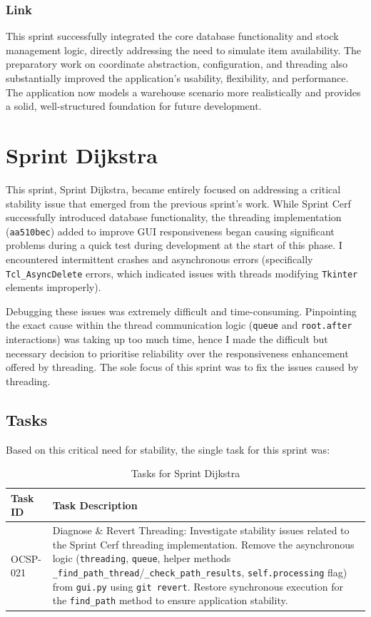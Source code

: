 \subsubsection{Link}
This sprint successfully integrated the core database functionality and stock management logic, directly addressing the need to simulate item availability. The preparatory work on coordinate abstraction, configuration, and threading also substantially improved the application's usability, flexibility, and performance. The application now models a warehouse scenario more realistically and provides a solid, well-structured foundation for future development.

\newpage

\section{Sprint Dijkstra}

This sprint, Sprint Dijkstra, became entirely focused on addressing a critical stability issue that emerged from the previous sprint's work. While Sprint Cerf successfully introduced database functionality, the threading implementation (\verb|aa510bec|) added to improve GUI responsiveness began causing significant problems during a quick test during development at the start of this phase. I encountered intermittent crashes and asynchronous errors (specifically \verb|Tcl_AsyncDelete| errors, which indicated issues with threads modifying \verb|Tkinter| elements improperly).

Debugging these issues was extremely difficult and time-consuming. Pinpointing the exact cause within the thread communication logic (\verb|queue| and \verb|root.after| interactions) was taking up too much time, hence I made the difficult but necessary decision to prioritise reliability over the responsiveness enhancement offered by threading. The sole focus of this sprint was to fix the issues caused by threading.

\subsection{Tasks}

Based on this critical need for stability, the single task for this sprint was:
\begin{table}[htbp]
	\centering
	\begin{tabularx}{\textwidth}{|l|X|}
		\hline
		\textbf{Task ID} & \textbf{Task Description} \\
		\hline
		OCSP-021 & Diagnose \& Revert Threading: Investigate stability issues related to the Sprint Cerf threading implementation. Remove the asynchronous logic (\verb|threading|, \verb|queue|, helper methods \verb|_find_path_thread|/\verb|_check_path_results|, \verb|self.processing| flag) from \verb|gui.py| using \verb|git revert|. Restore synchronous execution for the \verb|find_path| method to ensure application stability. \\
		\hline
	\end{tabularx}
	\caption{Tasks for Sprint Dijkstra}
\end{table}

